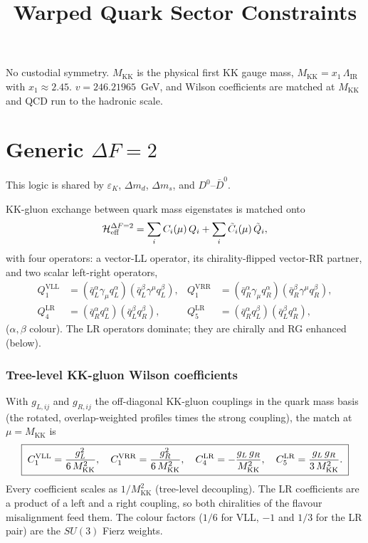 \documentclass[11pt]{article}
\title{\bf Warped Quark Sector Constraints}
\author{}
\date{}
\newcommand{\MKK}{M_{\mathrm{KK}}}
\newcommand{\LIR}{\Lambda_{\mathrm{IR}}}
\newcommand{\QVLL}{Q_1^{\mathrm{VLL}}}
\newcommand{\QVRR}{Q_1^{\mathrm{VRR}}}
\newcommand{\QLRfour}{Q_4^{\mathrm{LR}}}
\newcommand{\QLRfive}{Q_5^{\mathrm{LR}}}
\newcommand{\epsK}{\varepsilon_K}
\begin{document}
\maketitle
\vspace{-2.5em}

\noindent No custodial symmetry. $\MKK$ is the physical first KK gauge mass,
$\MKK = x_1\,\LIR$ with $x_1\approx2.45$. $v=246.21965$~GeV, and Wilson
coefficients are matched at $\MKK$ and QCD run to the hadronic scale.
\bigskip
\section*{Generic $\Delta F=2$}

This logic is shared by $\epsK$, $\Delta m_d$, $\Delta m_s$, and
$D^0$--$\bar D^0$.

KK-gluon exchange between quark mass eigenstates is matched onto
\begin{equation}
\mathcal{H}_{\rm eff}^{\Delta F=2}
= \sum_i C_i(\mu)\,Q_i + \sum_i \tilde C_i(\mu)\,\tilde Q_i ,
\end{equation}
with four operators: a vector-LL operator, its chirality-flipped vector-RR
partner, and two scalar left-right operators,
\begin{align}
\QVLL &= (\bar q_L^\alpha\gamma_\mu q_L^\alpha)(\bar q_L^\beta\gamma^\mu q_L^\beta), &
\QVRR &= (\bar q_R^\alpha\gamma_\mu q_R^\alpha)(\bar q_R^\beta\gamma^\mu q_R^\beta),\\
\QLRfour &= (\bar q_R^\alpha q_L^\alpha)(\bar q_L^\beta q_R^\beta), &
\QLRfive &= (\bar q_R^\alpha q_L^\beta)(\bar q_L^\beta q_R^\alpha),
\end{align}
($\alpha,\beta$ colour). The LR operators dominate; they are chirally and RG
enhanced (below).

\subsubsection*{Tree-level KK-gluon Wilson coefficients}
With $g_{L,ij}$ and $g_{R,ij}$ the off-diagonal KK-gluon couplings in the quark
mass basis (the rotated, overlap-weighted profiles times the strong coupling),
the match at $\mu=\MKK$ is
\begin{equation}
\boxed{\;
C_1^{\rm VLL}=\frac{g_{L}^2}{6\,\MKK^2},\quad
C_1^{\rm VRR}=\frac{g_{R}^2}{6\,\MKK^2},\quad
C_4^{\rm LR}=-\frac{g_{L}\,g_{R}}{\MKK^2},\quad
C_5^{\rm LR}=\frac{g_{L}\,g_{R}}{3\,\MKK^2}.
\;}
\end{equation}
Every coefficient scales as $1/\MKK^2$ (tree-level decoupling). The LR
coefficients are a product of a left and a right coupling, so both chiralities of
the flavour misalignment feed them. The colour factors ($1/6$ for VLL, $-1$ and
$1/3$ for the LR pair) are the $SU(3)$ Fierz weights.
\end{document}
